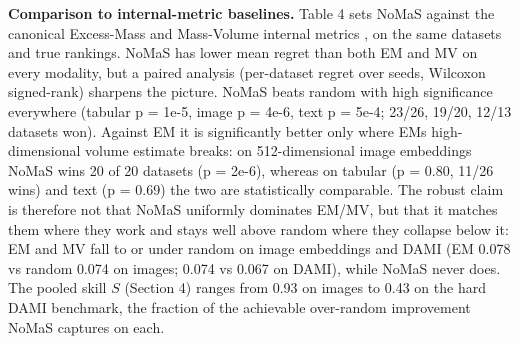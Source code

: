 \documentclass[3p,twocolumn]{elsarticle}
\begin{document}
\textbf{Comparison to internal-metric baselines.} Table 4 sets NoMaS against the canonical Excess-Mass and Mass-Volume internal metrics \cite{ref1}, on the same datasets and true rankings. NoMaS has lower mean regret than both EM and MV on every modality, but a paired analysis (per-dataset regret over seeds, Wilcoxon signed-rank) sharpens the picture. NoMaS beats random with high significance everywhere (tabular p = 1e-5, image p = 4e-6, text p = 5e-4; 23/26, 19/20, 12/13 datasets won). Against EM it is significantly better only where EM\textquotesingle s high-dimensional volume estimate breaks: on 512-dimensional image embeddings NoMaS wins 20 of 20 datasets (p = 2e-6), whereas on tabular (p = 0.80, 11/26 wins) and text (p = 0.69) the two are statistically comparable. The robust claim is therefore not that NoMaS uniformly dominates EM/MV, but that it matches them where they work and stays well above random where they collapse below it: EM and MV fall to or under random on image embeddings and DAMI (EM 0.078 vs random 0.074 on images; 0.074 vs 0.067 on DAMI), while NoMaS never does. The pooled skill \(S\) (Section 4) ranges from 0.93 on images to 0.43 on the hard DAMI benchmark, the fraction of the achievable over-random improvement NoMaS captures on each.
\end{document}

